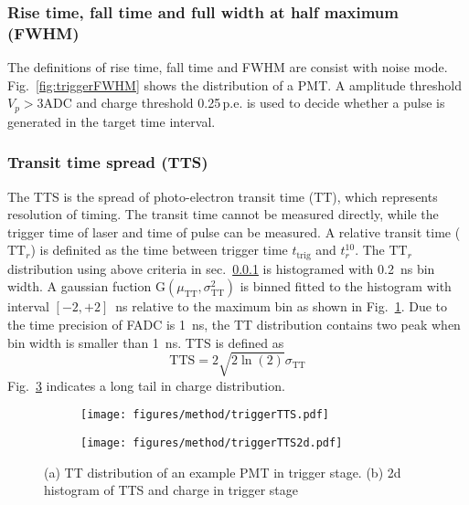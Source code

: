 \subsubsection{Rise time, fall time and full width at half maximum (FWHM)}
\label{sec:triggerFWHM}
The definitions of rise time, fall time and FWHM are consist with noise mode. Fig.~\ref{fig:triggerFWHM} shows the distribution of a PMT. A amplitude threshold $V_{p}>3\mathrm{ADC}$ and charge threshold 0.25\,p.e. is used to decide whether a pulse is generated in the target time interval.

\subsubsection{Transit time spread (TTS)}
The TTS is the spread of photo-electron transit time (TT), which represents resolution of timing. The transit time cannot be measured directly, while the trigger time of laser and time of pulse can be measured. A relative transit time ($\mathrm{TT}_r$) is definited as the time between trigger time $t_{\mathrm{trig}}$ and $t_r^{10}$. The $\mathrm{TT}_r$ distribution using above criteria in sec.~\ref{sec:triggerFWHM} is histogramed with \SI{0.2}{ns} bin width. A gaussian fuction G$(\mu_{\mathrm{TT}},\sigma_{\mathrm{TT}}^2)$ is binned fitted to the histogram with interval $[-2,+2]$\, ns relative to the maximum bin as shown in Fig.~\ref{fig:triggerTTS}. Due to the time precision of FADC is \SI{1}{ns}, the TT distribution contains two peak when bin width is smaller than \SI{1}{ns}. TTS is defined as
\begin{equation}
    \mathrm{TTS}=2\sqrt{2\ln(2)}\sigma_{\mathrm{TT}}
\end{equation}
Fig.~\ref{fig:triggerTTS2d} indicates a long tail in charge distribution.
\begin{figure}[!htbp]
    \centering
    \begin{subfigure}[t]{0.49\textwidth}
        \texttt{[image: figures/method/triggerTTS.pdf]}
        \caption{}
        \label{fig:triggerTTS}
    \end{subfigure}
    \begin{subfigure}[t]{0.49\textwidth}
        \texttt{[image: figures/method/triggerTTS2d.pdf]}
        \caption{}
        \label{fig:triggerTTS2d}
    \end{subfigure}
    \caption{(a) TT distribution of an example PMT in trigger stage. (b) 2d histogram of TTS and charge in trigger stage}
\end{figure}

